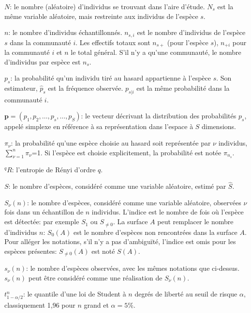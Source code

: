 \documentclass[
  11pt,
  american,
  a4paper,
  extrafontsizes,onecolumn,openright
  ]{memoir}
\newlength{\rf}
\begin{document}
\noindent \(N\): le nombre (aléatoire) d'individus se trouvant dans l'aire d'étude.
\(N_s\) est la même variable aléatoire, mais restreinte aux individus de l'espèce \(s\).

\noindent \(n\): le nombre d'individus échantillonnés.
\(n_{s,i}\) est le nombre d'individus de l'espèce \(s\) dans la communauté \(i\).
Les effectifs totaux sont \(n_{s+}\) (pour l'espèce \(s\)), \(n_{+i}\) pour la communauté \(i\) et \(n\) le total général.
S'il n'y a qu'une communauté, le nombre d'individus par espèce est \(n_s\).

\noindent \(p_s\): la probabilité qu'un individu tiré au hasard appartienne à l'espèce \(s\).
Son estimateur, \({\hat{p}}_s\) est la fréquence observée.
\(p_{s|i}\) est la même probabilité dans la communauté \(i\).

\noindent \(\mathbf{p}=\left( p_1, p_2, \dots, p_s, \dots, p_S \right)\): le vecteur décrivant la distribution des probabilités \(p_s\), appelé simplexe en référence à sa représentation dans l'espace à \(S\) dimensions.

\noindent \({\pi}_{\nu}\): la probabilité qu'une espèce choisie au hasard soit représentée par \(\nu\) individus, \(\sum^n_{\nu=1}{{\pi}_{\nu}}\)=1.
Si l'espèce est choisie explicitement, la probabilité est notée \({\pi}_{n_s}\).

\noindent \(^{q}\!R\): l'entropie de Rényi d'ordre \(q\).

\noindent \(S\): le nombre d'espèces, considéré comme une variable aléatoire, estimé par \(\hat{S}\).

\noindent \(S_{\nu}(n)\): le nombre d'espèces, considéré comme une variable aléatoire, observées \(\nu\) fois dans un échantillon de \(n\) individus.
L'indice est le nombre de fois où l'espèce est détectée: par exemple \(S_{1}\) ou \(S_{\ne 0}\).
La surface \(A\) peut remplacer le nombre d'individus \(n\): \(S_{0}(A)\) est le nombre d'espèces non rencontrées dans la surface \(A\).
Pour alléger les notations, s'il n'y a pas d'ambiguïté, l'indice est omis pour les espèces présentes: \(S_{\ne 0}(A)\) est noté \(S(A)\).

\noindent \(s_{\nu}(n)\): le nombre d'espèces observées, avec les mêmes notations que ci-dessus.
\(s_{\nu}(n)\) peut être considéré comme une réalisation de \(S_{\nu}(n)\).

\noindent \(t^{n}_{1-\alpha/2}\): le quantile d'une loi de Student à \(n\) degrés de liberté au seuil de risque \(\alpha\), classiquement 1,96 pour \(n\) grand et \(\alpha=5\%\).
\end{document}
